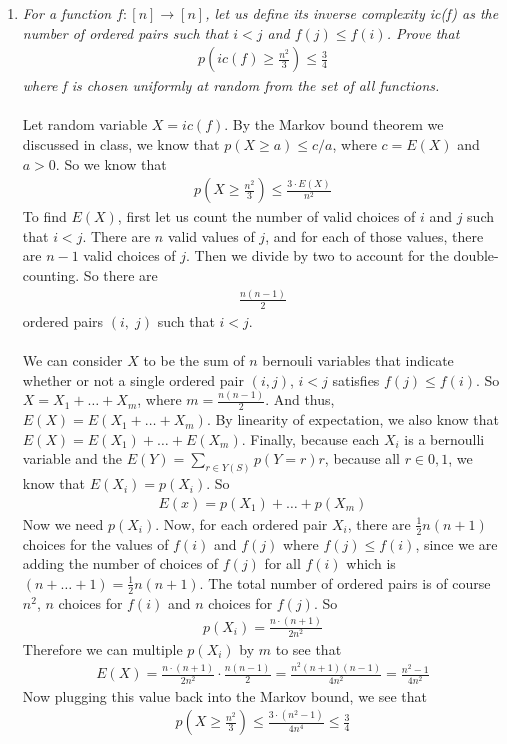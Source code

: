 \documentclass[a4paper]{article}
\begin{document}
\begin{enumerate}
\item \emph{For a function $f: [n] \longrightarrow [n]$, let us define its inverse complexity ic(f) as the number of ordered pairs such that $i < j$ and $f(j) \leq f(i)$. Prove that}
\begin{align}
\nonumber\displaystyle p\left( ic(f) \geq \frac{n^2}{3}\right) \leq \frac{3}{4}
\end{align}
\emph{where f is chosen uniformly at random from the set of all functions.} \\
\\
Let random variable $X = ic(f)$. By the Markov bound theorem we discussed in class, we know that $p(X \geq a) \leq c/a$, where $c = E(X)$ and $a > 0$. So we know that 
\begin{align*}
p\left(X \geq \frac{n^2}{3}\right) \leq \frac{3\cdot E(X)}{n^2}
\end{align*}
To find $E(X)$, first let us count the number of valid choices of $i$ and $j$ such that $i < j$. There are $n$ valid values of $j$, and for each of those values, there are $n-1$ valid choices of $j$. Then we divide by two to account for the double-counting. So there are 
\begin{align}
\nonumber \displaystyle \frac{n(n-1)}{2}
\end{align}
ordered pairs $(i,\;j)$ such that $i < j$. \\
\\
We can consider $X$ to be the sum of $n$ bernouli variables that indicate whether or not a single ordered pair $(i, j)$, $i < j$ satisfies $f(j) \leq f(i)$. So $X = X_1 + \dots + X_m$, where $m = \frac{n(n-1)}{2}$. And thus, $E(X) = E(X_1 + \dots + X_m)$. By linearity of expectation, we also know that $E(X) = E(X_1) + \dots + E(X_m)$. Finally, because each $X_i$ is a bernoulli variable and the $E(Y) = \sum_{r \in Y(S)} p(Y = r)r$, because all $r \in {0,1}$, we know that $E(X_i) = p(X_i)$. So
\begin{align*}
E(x) = p(X_1) + \dots + p(X_m)
\end{align*}
Now we need $p(X_i)$. Now, for each ordered pair $X_i$, there are $\frac{1}{2}n(n+1)$ choices for the values of $f(i)$ and $f(j)$ where $f(j) \leq f(i)$, since we are adding the number of choices of $f(j)$ for all $f(i)$ which is $(n + \dots + 1) = \frac{1}{2}n(n+1)$. The total number of ordered pairs is of course $n^2$, $n$ choices for $f(i)$ and $n$ choices for $f(j)$. So \\
\begin{align*}
p(X_i) = \frac{n\cdot(n+1)}{2n^2}
\end{align*}
Therefore we can multiple $p(X_i)$ by $m$ to see that
\begin{align*}
E(X) = \frac{n\cdot(n+1)}{2n^2} \cdot \frac{n(n-1)}{2} = \frac{n^2(n+1)(n-1)}{4n^2} = \frac{n^2 - 1}{4n^2}
\end{align*}
Now plugging this value back into the Markov bound, we see that
\begin{align*}
p\left(X \geq \frac{n^2}{3}\right) \leq \frac{3\cdot (n^2 -1)}{4n^4} \leq \frac{3}{4}
\end{align*}
\\



\end{enumerate}
\end{document}
